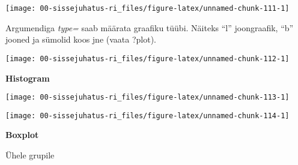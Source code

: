 \documentclass[
]{book}
\newenvironment{Shaded}{\begin{snugshade}}{\end{snugshade}}
\newcommand{\AttributeTok}[1]{\textcolor[rgb]{0.77,0.63,0.00}{#1}}
\newcommand{\DecValTok}[1]{\textcolor[rgb]{0.00,0.00,0.81}{#1}}
\newcommand{\FunctionTok}[1]{\textcolor[rgb]{0.00,0.00,0.00}{#1}}
\newcommand{\NormalTok}[1]{#1}
\newcommand{\SpecialCharTok}[1]{\textcolor[rgb]{0.00,0.00,0.00}{#1}}
\newcommand{\StringTok}[1]{\textcolor[rgb]{0.31,0.60,0.02}{#1}}
\begin{document}
\begin{center}\texttt{[image: 00-sissejuhatus-ri\_files/figure-latex/unnamed-chunk-111-1]} \end{center}

Argumendiga \emph{type=} saab määrata graafiku tüübi. Näiteks ``l'' joongraafik, ``b'' jooned ja sümolid koos jne (vaata ?plot).

\begin{Shaded}
\end{Shaded}

\begin{center}\texttt{[image: 00-sissejuhatus-ri\_files/figure-latex/unnamed-chunk-112-1]} \end{center}

\textbf{Histogram}

\begin{Shaded}
\end{Shaded}

\begin{center}\texttt{[image: 00-sissejuhatus-ri\_files/figure-latex/unnamed-chunk-113-1]} \end{center}

\begin{Shaded}
\end{Shaded}

\begin{center}\texttt{[image: 00-sissejuhatus-ri\_files/figure-latex/unnamed-chunk-114-1]} \end{center}

\textbf{Boxplot}

Ühele grupile

\begin{Shaded}
\end{Shaded}
\end{document}
